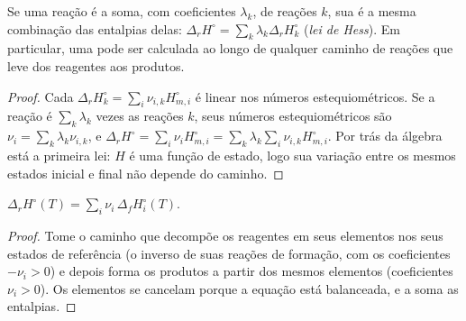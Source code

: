 \begin{theorem}\label{thm:b2:reaction-enthalpy:hess}
Se uma reação é a soma, com coeficientes $\lambda_k$, de reações $k$,
sua  é a mesma combinação das entalpias delas:
$\Delta_r H^\circ = \sum_k\lambda_k\Delta_r H_k^\circ$
(\emph{lei de Hess}). Em particular, uma  pode ser calculada ao longo de qualquer caminho de reações que
leve dos reagentes aos produtos.
\end{theorem}

\begin{proof}
Cada $\Delta_r H_k^\circ = \sum_i\nu_{i,k}H_{m,i}^\circ$ é linear nos
números estequiométricos. Se a reação é $\sum_k\lambda_k$ vezes as
reações $k$, seus números estequiométricos são $\nu_i = \sum_k\lambda_k
\nu_{i,k}$, e $\Delta_r H^\circ = \sum_i\nu_iH_{m,i}^\circ = \sum_k\lambda_k
\sum_i\nu_{i,k}H_{m,i}^\circ$. Por trás da álgebra está a primeira lei: $H$ é
uma função de estado, logo sua variação entre os mesmos estados inicial e
final não depende do caminho.
\end{proof}

\begin{proposition}\label{prop:b2:reaction-enthalpy:formation-sum}
$\Delta_r H^\circ(T) = \sum_i\nu_i\,\Delta_f H_i^\circ(T)$.
\end{proposition}

\begin{proof}
Tome o caminho que decompõe os reagentes em seus elementos nos seus
estados de referência (o inverso de suas reações de formação, com os
coeficientes $-\nu_i > 0$) e depois forma os produtos a partir dos mesmos
elementos (coeficientes $\nu_i > 0$). Os elementos se cancelam porque a
equação está balanceada, e a  soma as entalpias.
\end{proof}

